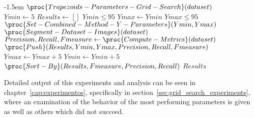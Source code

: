 \begin{codebox}
\kern-1.5em $\proc{Trapezoids-Parameters-Grid-Search}(dataset)$\\
\li $Ymin \gets 5$
\li $Results \gets []$
\li \While $Ymin \leq 95$
\li \Do
        $Ymax \gets Ymin$
\li     \While $Ymax \leq 95$
\li     \Do
            $\proc{Set-Combined-Method-Y-Parameters}(Ymin, Ymax)$ \label{alg:tpgs-set-cmb-y}
\li         $\proc{Segment-Dataset-Images}(dataset)$    \label{alg:tpgs-segment-dtset}
\li         $Precision, Recall, Fmeasure \gets \proc{Compute-Metrics}(dataset)$ \label{alg:tpgs-compt-metrcs}
\li         $\proc{Push}(Results, Ymin, Ymax, Precision, Recall, Fmeasure)$ \label{alg:tpgs-push-rslts}
\li\li      $Ymax \gets Ymax + 5$
        \End
\li      $Ymin \gets Ymin + 5$
    \End
\li
\li $\proc{Sort-By}(Results, Fmeasure, Precision, Recall)$
\li \Return $Results$
\end{codebox}

Detailed output of this experiments and analysis can be seen in chapter~\ref{cap:experimentos}, specifically in section~\ref{sec:grid_search_experiments}, where an examination of the behavior of the most performing parameters is given as well as others which did not succeed.